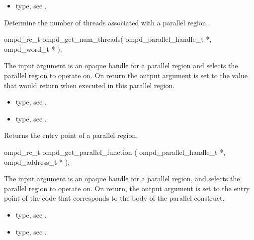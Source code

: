 \crossreferences
\begin{itemize}
	\item {} type, see .
\end{itemize}



\label{ompd:ompd_get_num_threads}
\summary
Determine the number of threads associated with a parallel region.

\format
\cspecificstart
\begin{boxedcode}
ompd\_rc\_t ompd\_get\_num\_threads(
  ompd\_parallel\_handle\_t *,
  ompd\_word\_t *
);
\end{boxedcode}
\cspecificend

\descr

\argdesc
The input argument  is an opaque handle for a parallel region and selects the parallel region to operate on.
On return the output argument  is set to the value that  would return when
executed in this parallel region.

\crossreferences
\begin{itemize}
	\item {} type, see .
	\item {} type, see .
\end{itemize}

\label{ompd:ompd_get_parallel_function}
\summary
Returns the entry point of a parallel region.

\format
\cspecificstart
\begin{boxedcode}
ompd\_rc\_t ompd\_get\_parallel\_function (
  ompd\_parallel\_handle\_t  *,
  ompd\_address\_t          *
);
\end{boxedcode}
\cspecificend

\descr

\argdesc
The input argument  is an opaque handle for a
parallel region, and selects the parallel region to operate on.
On return,  the output argument  is set to the
entry point of the code that corresponds to the body of the parallel
construct.

\crossreferences
\begin{itemize}
	\item {} type, see .
	\item {} type, see .
\end{itemize}



